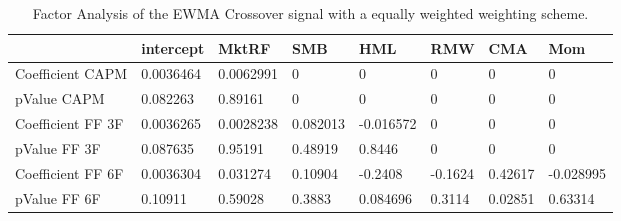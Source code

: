 \begin{table}[H]
\centering
\begin{tabular}{llllllll}
& intercept & MktRF & SMB & HML & RMW & CMA & Mom \\ 
\hline 
Coefficient CAPM & 0.0036464 & 0.0062991 & 0 & 0 & 0 & 0 & 0 \\ 
pValue CAPM & 0.082263 & 0.89161 & 0 & 0 & 0 & 0 & 0 \\ 
Coefficient FF 3F & 0.0036265 & 0.0028238 & 0.082013 & -0.016572 & 0 & 0 & 0 \\ 
pValue FF 3F & 0.087635 & 0.95191 & 0.48919 & 0.8446 & 0 & 0 & 0 \\ 
Coefficient FF 6F & 0.0036304 & 0.031274 & 0.10904 & -0.2408 & -0.1624 & 0.42617 & -0.028995 \\ 
pValue FF 6F & 0.10911 & 0.59028 & 0.3883 & 0.084696 & 0.3114 & 0.02851 & 0.63314 \\ 
\hline
\end{tabular}
\caption{Factor Analysis of the EWMA Crossover signal with a equally weighted weighting scheme.}
\label{MBBSEWOQ_FACTOR}
\end{table}